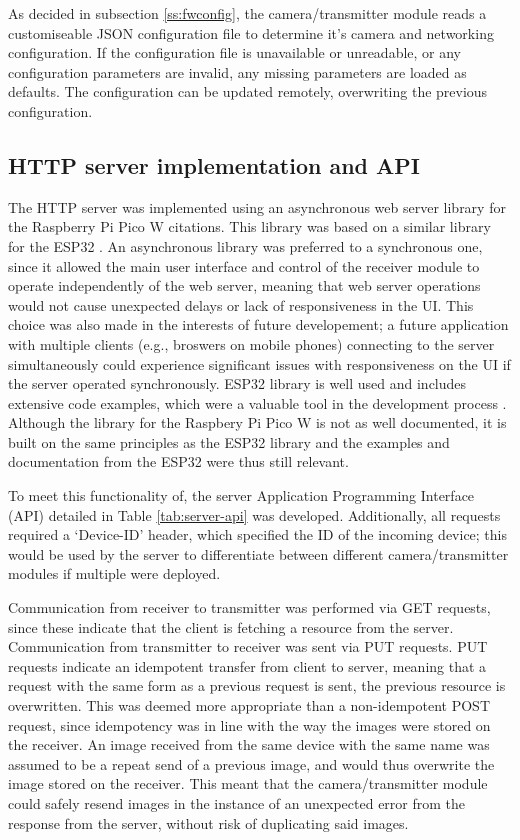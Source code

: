 \documentclass[class=report,11pt,crop=false]{standalone}
\begin{document}
As decided in subsection \ref{ss:fwconfig}, the camera/transmitter module reads a customiseable JSON configuration file to determine it's camera and networking configuration. If the configuration file is unavailable or unreadable, or any configuration parameters are invalid, any missing parameters are loaded as defaults. The configuration can be updated remotely, overwriting the previous configuration.

\subsection{HTTP server implementation and API}

The HTTP server was implemented using an asynchronous web server library for the Raspberry Pi Pico W citations\cite{hoang2023async}. This library was based on a similar library for the ESP32 \cite{gochkov2023async}. An asynchronous library was preferred to a synchronous one, since it allowed the main user interface and control of the receiver module to operate independently of the web server, meaning that web server operations would not cause unexpected delays or lack of responsiveness in the UI. This choice was also made in the interests of future developement; a future application with multiple clients (e.g., broswers on mobile phones) connecting to the server simultaneously could experience significant issues with responsiveness on the UI if the server operated synchronously. ESP32 library is well used and includes extensive code examples, which were a valuable tool in the development process  \cite{hoang2023async}. Although the library for the Raspbery Pi Pico W is not as well documented, it is built on the same principles as the ESP32 library and the examples and documentation from the ESP32 were thus still relevant.

To meet this functionality of, the server Application Programming Interface (API) detailed in Table \ref{tab:server-api} was developed. Additionally, all requests required a `Device-ID' header, which specified the ID of the incoming device; this would be used by the server to differentiate between different camera/transmitter modules if multiple were deployed.

Communication from receiver to transmitter was performed via GET requests, since these indicate that the client is fetching a resource from the server. Communication from transmitter to receiver was sent via PUT requests. PUT requests indicate an idempotent transfer from client to server, meaning that a request with the same form as a previous request is sent, the previous resource is overwritten. This was deemed more appropriate than a non-idempotent POST request, since idempotency was in line with the way the images were stored on the receiver. An image received from the same device with the same name was assumed to be a repeat send of a previous image, and would thus overwrite the image stored on the receiver. This meant that the camera/transmitter module could safely resend images in the instance of an unexpected error from the response from the server, without risk of duplicating said images.
\end{document}
